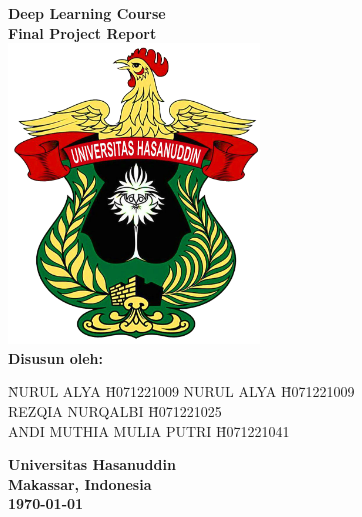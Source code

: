 \documentclass[12pt,a4paper]{article}
\begin{document}
\begin{titlepage}
    \centering
    \vspace*{1cm}

   

    {\LARGE \textbf{Deep Learning Course}}\\[0.5cm]
    {\Large \textbf{Final Project Report}}\\[1.5cm]

     \includegraphics[width=0.5\textwidth]{Image/Logo-Resmi-Unhas-1.png}\\[1cm] %
    
    \textbf{Disusun oleh:}\\[0.5cm]
    \begin{tabbing}
        \hspace{3cm} \= NURUL ALYA \hspace{3cm} \= H071221009 \kill
        \> NURUL ALYA \hspace{5.27cm} \= H071221009 \\
        \> REZQIA NURQALBI \hspace{4cm} \= H071221025 \\
        \> ANDI MUTHIA MULIA PUTRI \hspace{2cm} \= H071221041 \\
    \end{tabbing}
    
    \vfill
    
    \textbf{Universitas Hasanuddin}\\
    \textbf{Makassar, Indonesia}\\[0.5cm]
    \textbf{\today}
    
\end{titlepage}
\end{document}
